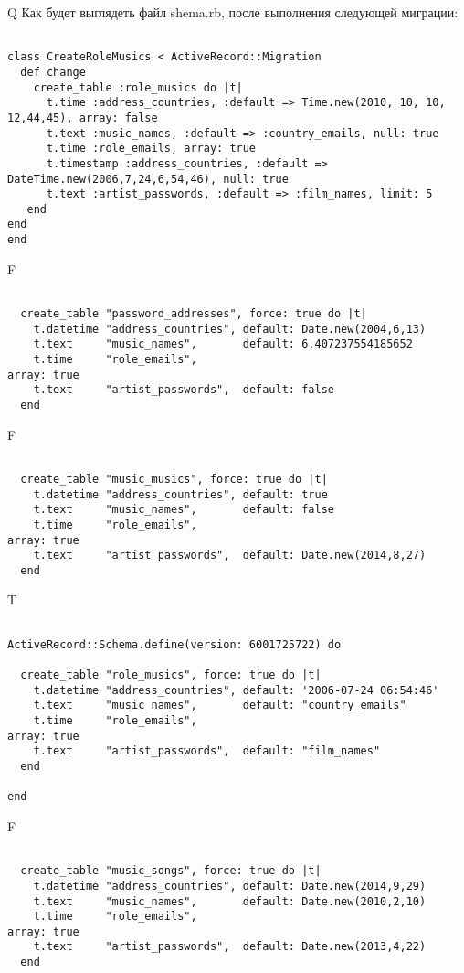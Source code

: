 Q
Как будет выглядеть файл shema.rb, после выполнения следующей миграции:

\begin{verbatim}

class CreateRoleMusics < ActiveRecord::Migration 
  def change 
    create_table :role_musics do |t| 
      t.time :address_countries, :default => Time.new(2010, 10, 10, 12,44,45), array: false
      t.text :music_names, :default => :country_emails, null: true
      t.time :role_emails, array: true
      t.timestamp :address_countries, :default => DateTime.new(2006,7,24,6,54,46), null: true
      t.text :artist_passwords, :default => :film_names, limit: 5
   end
end
end
\end{verbatim}

F
\begin{verbatim}

  create_table "password_addresses", force: true do |t|
    t.datetime "address_countries", default: Date.new(2004,6,13)
    t.text     "music_names",       default: 6.407237554185652
    t.time     "role_emails",                                       array: true
    t.text     "artist_passwords",  default: false
  end

\end{verbatim}

F
\begin{verbatim}

  create_table "music_musics", force: true do |t|
    t.datetime "address_countries", default: true
    t.text     "music_names",       default: false
    t.time     "role_emails",                                       array: true
    t.text     "artist_passwords",  default: Date.new(2014,8,27)
  end

\end{verbatim}

T
\begin{verbatim}

ActiveRecord::Schema.define(version: 6001725722) do

  create_table "role_musics", force: true do |t|
    t.datetime "address_countries", default: '2006-07-24 06:54:46'
    t.text     "music_names",       default: "country_emails"
    t.time     "role_emails",                                       array: true
    t.text     "artist_passwords",  default: "film_names"
  end

end
\end{verbatim}


F
\begin{verbatim}

  create_table "music_songs", force: true do |t|
    t.datetime "address_countries", default: Date.new(2014,9,29)
    t.text     "music_names",       default: Date.new(2010,2,10)
    t.time     "role_emails",                                       array: true
    t.text     "artist_passwords",  default: Date.new(2013,4,22)
  end

\end{verbatim}

